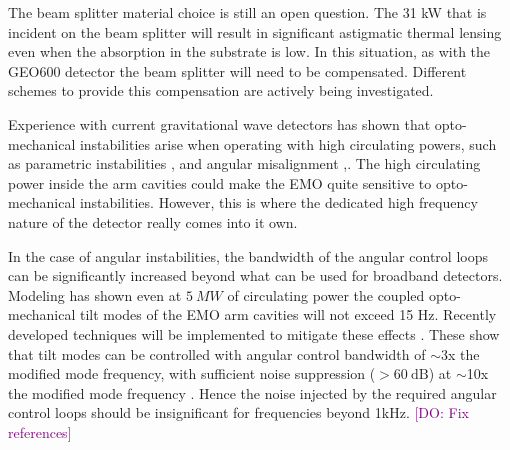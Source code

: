 \documentclass[prx,superscriptaddress,twocolumn,nopreprintnumbers,floatfix,nofootinbib]{revtex4}
\newcommand{\djo}[1]{\textcolor{purple}{[DO: #1]}}
\begin{document}
The beam splitter material choice is still an open question. The 31 kW that is incident on the beam splitter will result in significant astigmatic thermal lensing even when the absorption in the substrate is low. In this situation, as with the GEO600 detector \cite{Wittel18_BSComp} the beam splitter will need to be compensated. Different schemes to provide this compensation are actively being investigated.  

Experience with current gravitational wave detectors has shown that  opto-mechanical instabilities arise when operating with high circulating powers, such as parametric instabilities \cite{evans2015observation}, and angular misalignment \cite{sidles2006optical},\cite{hirose2010angular}. The high circulating power inside the arm cavities could make the EMO quite sensitive to opto-mechanical instabilities. However, this is where the dedicated high frequency nature of the detector really comes into it own. 

In the case of angular instabilities, the bandwidth of the angular control loops can be significantly increased beyond what can be used for broadband detectors.  Modeling has shown even at $5~MW$ of circulating power the coupled opto-mechanical tilt modes of the EMO arm cavities will not exceed 15 Hz. Recently developed techniques will be implemented to mitigate these effects \cite{amd}. These show that tilt modes can be controlled with angular control bandwidth of $\sim$3x the modified mode frequency, with sufficient noise suppression ($>60~\text{dB}$) at $\sim$10x the modified mode frequency\cite{LIGO-T1400226} \cite{barsotti_2010}. Hence the noise injected by the required angular control loops should be insignificant for frequencies beyond 1kHz. \djo{Fix references}
 
\end{document}
